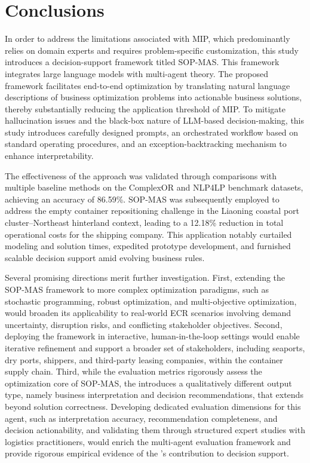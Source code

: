 \documentclass[preprint,12pt]{elsarticle}
\begin{document}
\section{Conclusions}

In order to address the limitations associated with MIP, which predominantly relies on domain experts and requires problem-specific customization, this study introduces a decision-support framework titled SOP-MAS. This framework integrates large language models with multi-agent theory. The proposed framework facilitates end-to-end optimization by translating natural language descriptions of business optimization problems into actionable business solutions, thereby substantially reducing the application threshold of MIP. To mitigate hallucination issues and the black-box nature of LLM-based decision-making, this study introduces carefully designed prompts, an orchestrated workflow based on standard operating procedures, and an exception-backtracking mechanism to enhance interpretability.

The effectiveness of the approach was validated through comparisons with multiple baseline methods on the ComplexOR and NLP4LP benchmark datasets, achieving an accuracy of 86.59\%. SOP-MAS was subsequently employed to address the empty container repositioning challenge in the Liaoning coastal port cluster–Northeast hinterland context, leading to a 12.18\% reduction in total operational costs for the shipping company. This application notably curtailed modeling and solution times, expedited prototype development, and furnished scalable decision support amid evolving business rules.

 Several promising directions merit further investigation. First, extending the SOP-MAS framework to more complex optimization paradigms, such as stochastic programming, robust optimization, and multi-objective optimization, would broaden its applicability to real-world ECR scenarios involving demand uncertainty, disruption risks, and conflicting stakeholder objectives. Second, deploying the framework in interactive, human-in-the-loop settings would enable iterative refinement and support a broader set of stakeholders, including seaports, dry ports, shippers, and third-party leasing companies, within the container supply chain. Third, while the evaluation metrics rigorously assess the optimization core of SOP-MAS, the  introduces a qualitatively different output type, namely business interpretation and decision recommendations, that extends beyond solution correctness. Developing dedicated evaluation dimensions for this agent, such as interpretation accuracy, recommendation completeness, and decision actionability, and validating them through structured expert studies with logistics practitioners, would enrich the multi-agent evaluation framework and provide rigorous empirical evidence of the 's contribution to decision support.
\end{document}
